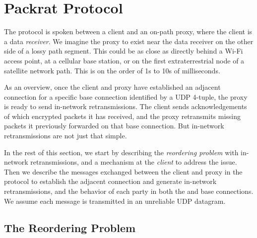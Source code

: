 \section{Packrat Protocol}
\label{sec:packrat-protocol}

The \Sys protocol is spoken between a client and an on-path proxy, where the
client is a data \textit{receiver}. We imagine the proxy to exist near the data
receiver on the other side of a lossy path segment. This could be as close as
directly behind a Wi-Fi access point, at a cellular base station, or on the
first extraterrestrial node of a satellite network path. This is on the order
of 1s to 10s of milliseconds.

As an overview, once the client and proxy have established an adjacent
connection for a specific base connection identified by a UDP 4-tuple, the
proxy is ready to send in-network retransmissions. The client sends
acknowledgements of which encrypted packets it has received, and the proxy retransmits missing
packets it previously forwarded on that base connection.
But in-network retransmissions are not just that simple.

In the rest of this section, we start by describing the \textit
{reordering problem} with in-network retransmissions, and a mechanism at
the \textit{client} to address the issue. Then we describe the messages
exchanged between the client and proxy in the \Sys protocol to establish the
adjacent connection and generate in-network retransmissions,
and the behavior of each party in both the \Sys and base
connections. We assume each message is transmitted in an unreliable UDP
datagram.

\subsection{The Reordering Problem}
\label{sec:packet-protocol:problem}

